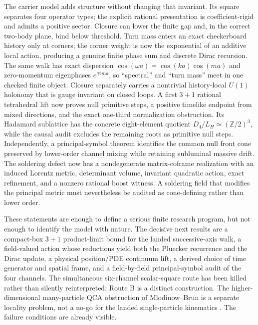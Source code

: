 \documentclass[11pt]{article}
\newcommand{\ii}{\mathrm{i}}
\newcommand{\Z}{\mathbb{Z}}
\begin{document}
The carrier model adds structure without changing that invariant.  Its square
separates four operator types; the explicit rational presentation is
coefficient-rigid and admits a positive sector.  Closure can lower the finite
gap and, in the correct two-body plane, bind below threshold.  Turn mass enters
an exact checkerboard history only at corners; the corner weight is now the
exponential of an additive local action, producing a genuine finite phase sum
and discrete Dirac recursion.  The same walk has exact dispersion
$\cos(\omega a)=\cos(ka)\cos(ma)$ and zero-momentum eigenphases
$e^{\mp\ii ma}$, so ``spectral'' and ``turn mass'' meet in one checked finite
object.  Closure separately carries a nontrivial
history-local $U(1)$ holonomy that is gauge invariant on closed loops.  A first
$3+1$ rational tetrahedral lift now
proves null primitive steps, a positive timelike endpoint from mixed
directions, and the exact one-third normalization obstruction.  Its Hadamard
sublattice has the concrete eight-element quotient
$D_4/L_H\simeq(\Z/2)^3$, while the causal audit excludes the remaining roots as
primitive null steps.  Independently,
a principal-symbol theorem identifies the common null front cone preserved by
lower-order channel mixing while retaining subluminal massive drift.  The
soldering defect now has a nondegenerate matrix-coframe realization with an
induced Lorentz metric, determinant volume, invariant quadratic action, exact
refinement, and a nonzero rational boost witness.  A soldering field that
modifies the principal metric must nevertheless be audited as cone-defining
rather than lower order.

These statements are enough to define a serious finite research program, but
not enough to identify the model with nature.  The decisive next results are
a compact-box $3+1$ product-limit bound for the landed successive-axis walk, a
field-valued action whose reductions yield both the Pluecker recurrence and
the Dirac update, a physical position/PDE continuum lift, a derived choice of
time generator and spatial frame, and a field-by-field principal-symbol audit
of the four channels.  The simultaneous six-channel scalar-square route has
been killed rather than silently reinterpreted; Route B is a distinct
construction.  The higher-dimensional many-particle QCA obstruction of
Mlodinow--Brun is a separate locality problem, not a no-go for the landed
single-particle kinematics \cite{MlodinowBrunNoGo}.  The failure conditions are
already visible.
\end{document}
